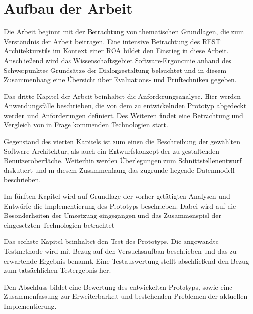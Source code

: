\section{Aufbau der Arbeit}

Die Arbeit beginnt mit der Betrachtung von thematischen Grundlagen, die zum Verständnis der Arbeit beitragen. Eine intensive Betrachtung des \acf{REST} Architekturstils im Kontext einer \acf{ROA} bildet den Einstieg in diese Arbeit. Anschließend wird das Wissenschaftsgebiet Software-Ergonomie anhand des Schwerpunktes Grundsätze der Dialoggestaltung beleuchtet und in diesem Zusammenhang eine Übersicht über Evaluations- und Prüftechniken gegeben.

Das dritte Kapitel der Arbeit beinhaltet die Anforderungsanalyse. Hier werden Anwendungsfälle beschrieben, die von dem zu entwickelnden Prototyp abgedeckt werden und Anforderungen definiert. Des Weiteren findet eine Betrachtung und Vergleich von in Frage kommenden Technologien statt.

Gegenstand des vierten Kapitels ist zum einen die Beschreibung der gewählten Software-Architektur, als auch ein Entwurfskonzept der zu gestaltenden Benutzeroberfläche. Weiterhin werden Überlegungen zum Schnittstellenentwurf diskutiert und in diesem Zusammenhang das zugrunde liegende Datenmodell beschrieben.

Im fünften Kapitel wird auf Grundlage der vorher getätigten Analysen und Entwürfe die Implementierung des Prototyps beschrieben. Dabei wird auf die Besonderheiten der Umsetzung eingegangen und das Zusammenspiel der eingesetzten Technologien betrachtet. 

Das sechste Kapitel beinhaltet den Test des Prototyps. Die angewandte Testmethode wird mit Bezug auf den Versuchsaufbau beschrieben und das zu erwartende Ergebnis benannt. Eine Testauswertung stellt abschließend den Bezug zum tatsächlichen Testergebnis her.

Den Abschluss bildet eine Bewertung des entwickelten Prototyps, sowie eine Zusammenfassung zur Erweiterbarkeit und bestehenden Problemen der aktuellen Implementierung.